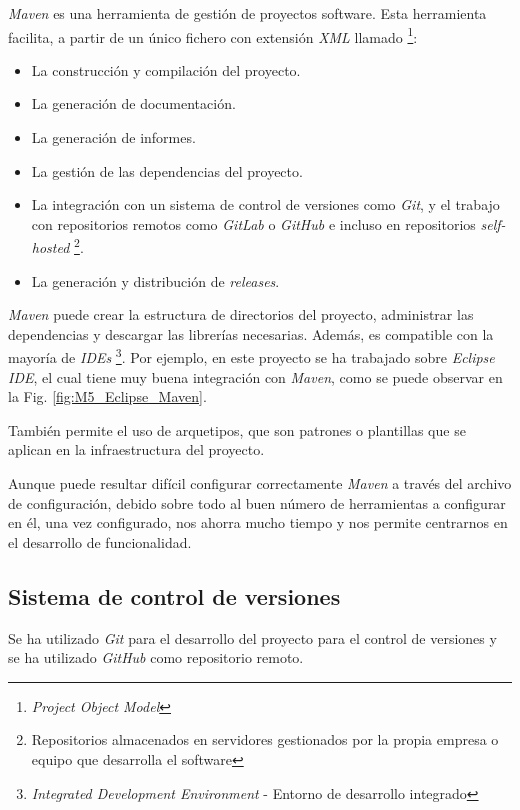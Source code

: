 \textit{Maven} es una herramienta de gestión de proyectos software. Esta herramienta facilita, a partir de un único fichero con extensión \textit{XML} llamado  \footnote{\textit{Project Object Model}}:
\begin{itemize}
	\tightlist
	\item La construcción y compilación del proyecto.
	\item La generación de documentación.
	\item La generación de informes.
	\item La gestión de las dependencias del proyecto.
	\item La integración con un sistema de control de versiones como \textit{Git}, y el trabajo con repositorios remotos como \textit{GitLab} o \textit{GitHub} e incluso en repositorios \textit{self-hosted} \footnote{Repositorios almacenados en servidores gestionados por la propia empresa o equipo que desarrolla el software}.
	\item La generación y distribución de \textit{releases}.
\end{itemize}
\textit{Maven} puede crear la estructura de directorios del proyecto, administrar las dependencias y descargar las librerías necesarias. Además, es compatible con la mayoría de \textit{IDEs} \footnote{\textit{Integrated Development Environment} - Entorno de desarrollo integrado}. Por ejemplo, en este proyecto se ha trabajado sobre \textit{Eclipse IDE}, el cual tiene muy buena integración con \textit{Maven}, como se puede observar en la Fig. \ref{fig:M5_Eclipse_Maven}.


También permite el uso de arquetipos, que son patrones o plantillas que se aplican en la infraestructura del proyecto.

Aunque puede resultar difícil configurar correctamente \textit{Maven} a través del archivo de configuración, debido sobre todo al buen número de herramientas a configurar en él, una vez configurado, nos ahorra mucho tiempo y nos permite centrarnos en el desarrollo de funcionalidad.

\subsection{Sistema de control de versiones}

Se ha utilizado \textit{Git} para el desarrollo del proyecto para el control de versiones y se ha utilizado \textit{GitHub} como repositorio remoto. 


